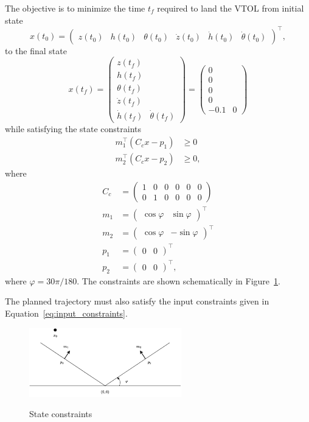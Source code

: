 \documentclass{article}
\begin{document}
The objective is to minimize the time $t_f$ required to land the VTOL from initial state
\[
x(t_0) = \begin{pmatrix}z(t_0) & h(t_0) & \theta(t_0) & \dot{z}(t_0) & \dot{h}(t_0) & \dot{\theta}(t_0) \end{pmatrix}^\top,
\]
to the final state
\[
x(t_f) = \begin{pmatrix} z(t_f) \\ h(t_f) \\ \theta(t_f) \\ \dot{z}(t_f) \\ \dot{h}(t_f) & \dot{\theta}(t_f) \end{pmatrix} 
	   = \begin{pmatrix} 0 \\ 0 \\ 0 \\ 0 \\ -0.1 & 0 \end{pmatrix}
\]
while satisfying the state constraints
\begin{align*}
	m_1^\top (C_c x - p_1) &\geq 0 \\
	m_2^\top (C_c x - p_2) &\geq 0,	
\end{align*}
where
\begin{align*}
C_c &= \begin{pmatrix} 1 & 0 & 0 & 0 & 0 & 0 \\ 0 & 1 & 0 & 0 & 0 & 0 \end{pmatrix} \\
m_1 &= \begin{pmatrix} \cos\varphi & \sin\varphi \end{pmatrix}^\top \\	
m_2 &= \begin{pmatrix} \cos\varphi & -\sin\varphi \end{pmatrix}^\top \\	
p_1 &= \begin{pmatrix} 0 & 0 \end{pmatrix}^\top \\	
p_2 &= \begin{pmatrix} 0 & 0 \end{pmatrix}^\top,
\end{align*}
where $\varphi = 30\pi/180$. 
The constraints are shown schematically in Figure~\ref{fig:constraints}.

The planned trajectory must also satisfy the input constraints given in Equation~\eqref{eq:input_constraints}.


\begin{figure}
  \centering
  \includegraphics[width=0.59\textwidth]{figures/landing_constraints}\\
  \caption{State constraints}
  \label{fig:constraints}
\end{figure}




\end{document}
